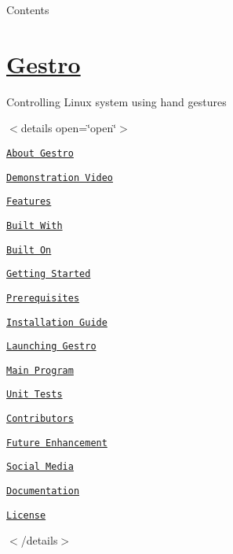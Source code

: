 Contents

\section*{\hyperlink{namespaceGestro}{Gestro}}

\href{https://github.com/RandomGuy-coder/Gestro}{\tt }

Controlling Linux system using hand gestures



     



$<$details open=\char`\"{}open\char`\"{}$>$


\begin{DoxyEnumerate}
\item \href{#About-Gestro}{\tt About Gestro} 
\begin{DoxyItemize}
\item \href{#Demonstration-Video}{\tt Demonstration Video} 
\item \href{#Features}{\tt Features} 
\item \href{#Built-With}{\tt Built With} 
\item \href{#Built-On}{\tt Built On} 
\end{DoxyItemize}
\item \href{#Getting-Started}{\tt Getting Started} 
\begin{DoxyItemize}
\item \href{#Prerequisites}{\tt Prerequisites} 
\item \href{#Installation-Guide}{\tt Installation Guide} 
\end{DoxyItemize}
\item \href{#Launching-Gestro}{\tt Launching Gestro} 
\begin{DoxyItemize}
\item \href{#Main-Program}{\tt Main Program} 
\item \href{#Unit-Tests}{\tt Unit Tests} 
\end{DoxyItemize}


\item \href{#Contributors}{\tt Contributors} 
\item \href{#Future-Enhancement}{\tt Future Enhancement} 
\item \href{#Social-Media}{\tt Social Media} 
\item \href{#Documentation}{\tt Documentation} 
\item \href{#License}{\tt License} 
\end{DoxyEnumerate}$<$/details$>$

